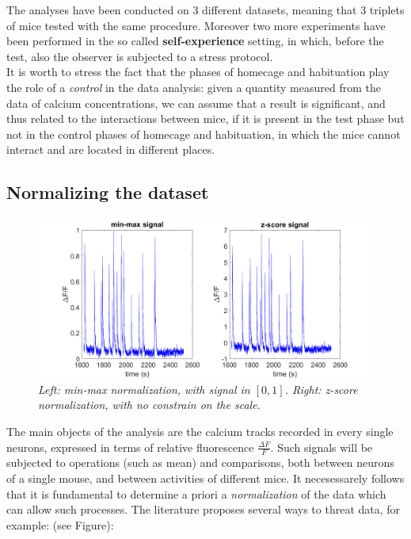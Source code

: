 \documentclass[a4paper]{article}
\begin{document}
		
The analyses have been conducted on 3 different datasets, meaning that 3 triplets of mice tested with the same procedure. Moreover two more experiments have been performed in the so called \textbf{self-experience} setting, in which, before the test, also the observer is subjected to a stress protocol.\\
It is worth to stress the fact that the phases of homecage and habituation play the role of a \textit{control} in the data analysis: given a quantity measured from the data of calcium concentrations, we can assume that a result is significant, and thus related to the interactions between mice, if it is present in the test phase but not in the control phases of homecage and habituation, in which the mice cannot interact and are located in different places.

\subsection{Normalizing the dataset}
	
	
	\begin{figure}[H]
			
		\begin{center}
			\hspace*{-2.1cm}
			\includegraphics[scale=.45]{normalizations.png} 
		\end{center} 
		\caption{\textit{Left: min-max normalization, with signal in $[0,1]$. Right: z-score normalization, with no constrain on the scale. }}
		
	\end{figure}
The main objects of the analysis are the calcium tracks recorded in every single neurons, expressed in terms of relative fluorescence $\frac{\Delta F}{F}$. Such signals will be subjected to operations (such as mean) and comparisons, both between neurons of a single mouse, and between activities of different mice. It necesessarely follows that it is fundamental to determine a priori a \textit{normalization} of the data which can allow such processes. The literature proposes several ways to threat data, for example: (see Figure):
\end{document}
